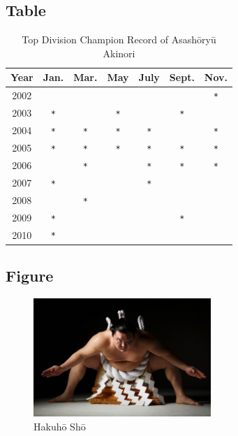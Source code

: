 \documentclass[a4paper,10pt]{article}
\begin{document}
    \subsection{Table}
    \begin{table}[htbp]
        \centering
        \begin{tabular}{c|cccccc}
            \hline
            Year & Jan. & Mar. & May & July & Sept. & Nov. \\
            \hline
            2002 &        &        &        &        &        &\verb|*|\\
            2003 &\verb|*|&        &\verb|*|&        &\verb|*|&        \\
            2004 &\verb|*|&\verb|*|&\verb|*|&\verb|*|&        &\verb|*|\\
            2005 &\verb|*|&\verb|*|&\verb|*|&\verb|*|&\verb|*|&\verb|*|\\
            2006 &        &\verb|*|&        &\verb|*|&\verb|*|&\verb|*|\\
            2007 &\verb|*|&        &        &\verb|*|&        &        \\
            2008 &        &\verb|*|&        &        &        &        \\
            2009 &\verb|*|&        &        &        &\verb|*|&        \\
            2010 &\verb|*|&        &        &        &        &        \\
            \hline
        \end{tabular}
        \caption{Top Division Champion Record of Asash\=ory\=u Akinori}
        \label{table} %
    \end{table}
    \subsection{Figure}
    \begin{figure}[htbp]
        \centering
        \includegraphics[width=0.6\textwidth]{img/Hakuho.jpg}
        \caption{Hakuh\=o Sh\=o}
        \label{figure} %
    \end{figure}
\end{document}

